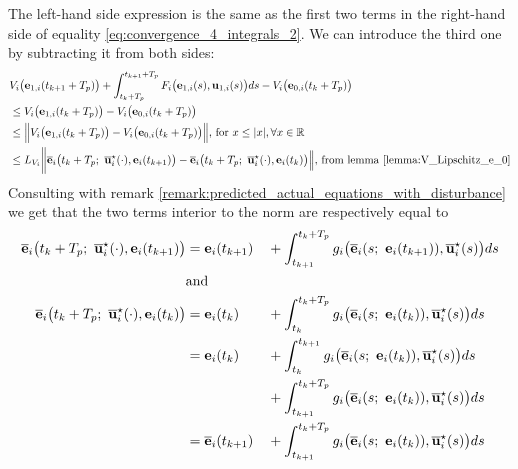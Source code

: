 \begin{gg_box}
  The left-hand side expression is the same as the first two terms in the
  right-hand side of equality \eqref{eq:convergence_4_integrals_2}. We can
  introduce the third one by subtracting it from both sides:
  \begin{align}
    &V_i\big(\vect{e}_{1,i}(t_{k+1} + T_p)\big)
    + \int_{t_k + T_p}^{t_{k+1} + T_p} F_i\big(\vect{e}_{1,i}(s), \vect{u}_{1,i}(s)\big) ds
    - V_i\big(\vect{e}_{0,i}(t_k + T_p)\big) \\
    &\leq V_i\big(\vect{e}_{1,i}(t_k + T_p)\big)
    - V_i\big(\vect{e}_{0,i}(t_k + T_p)\big) \\
    &\leq \Big\|V_i\big(\vect{e}_{1,i}(t_k + T_p)\big)
    - V_i\big(\vect{e}_{0,i}(t_k + T_p)\big)\Big\| \text{, for } x \leq |x|, \forall x \in \mathbb{R} \\
    &\leq L_{V_i}\bigg \|\overline{\vect{e}}_i\big(t_k + T_p;\ \overline{\vect{u}}_i^{\star}(\cdot), \vect{e}_i(t_{k+1})\big)
    - \overline{\vect{e}}_i\big(t_k + T_p;\ \overline{\vect{u}}_i^{\star}(\cdot), \vect{e}_i(t_k) \big)\Big\|
    \text{, from lemma } \eqref{lemma:V_Lipschitz_e_0}
    \label{eq:V_diff_intermediate}
  \end{align}
  Consulting with remark \eqref{remark:predicted_actual_equations_with_disturbance}
  we get that the two terms interior to the norm are respectively equal to
  \begin{alignat}{2}
    \overline{\vect{e}}_i\big(t_k + T_p;\ \overline{\vect{u}}_i^{\star}(\cdot), \vect{e}_i(t_{k+1})\big)
      &= \vect{e}_i(t_{k+1}) &&+ \int_{t_{k+1}}^{t_k + T_p} g_i\big(\overline{\vect{e}}_i(s;\ \vect{e}_i(t_{k+1})), \overline{\vect{u}}_i^{\star}(s) \big)ds \\
      &\text{and}\\
    \overline{\vect{e}}_i\big(t_k + T_p;\ \overline{\vect{u}}_i^{\star}(\cdot), \vect{e}_i(t_k)\big)
      &= \vect{e}_i(t_k)     &&+ \int_{t_k}^{t_k + T_p} g_i\big(\overline{\vect{e}}_i(s;\ \vect{e}_i(t_k)), \overline{\vect{u}}_i^{\star}(s) \big)ds \\
      &= \vect{e}_i(t_k)     &&+ \int_{t_k}^{t_{k+1}} g_i\big(\overline{\vect{e}}_i(s;\ \vect{e}_i(t_k)), \overline{\vect{u}}_i^{\star}(s) \big)ds \\
      &                      &&+ \int_{t_{k+1}}^{t_k + T_p} g_i\big(\overline{\vect{e}}_i(s;\ \vect{e}_i(t_k)), \overline{\vect{u}}_i^{\star}(s) \big)ds \\
      &= \overline{\vect{e}}_i(t_{k+1}) &&+ \int_{t_{k+1}}^{t_k + T_p} g_i\big(\overline{\vect{e}}_i(s;\ \vect{e}_i(t_k)), \overline{\vect{u}}_i^{\star}(s) \big)ds \\

\end{alignat}
\end{gg_box}
